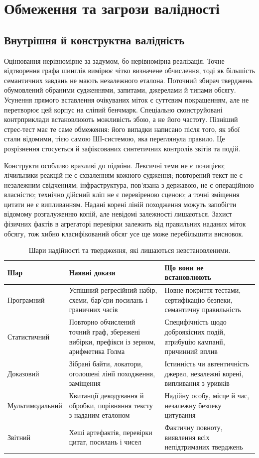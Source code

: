 \section{Обмеження та загрози валідності}
\subsection{Внутрішня й конструктна валідність}
Оцінювання нерівномірне за задумом, бо нерівномірна реалізація. Точне відтворення графа шинглів вимірює чітко визначене обчислення, тоді як більшість семантичних завдань не мають незалежного еталона. Поточний збирач тверджень обумовлений обраними судженнями, запитами, джерелами й типами обсягу. Усунення прямого вставлення очікуваних міток є суттєвим покращенням, але не перетворює цей корпус на сліпий бенчмарк. Спеціально сконструйовані контрприклади встановлюють можливість збою, а не його частоту. Пізніший стрес-тест має те саме обмеження: його випадки написано після того, як збої стали відомими, тією самою ШІ-системою, яка переглянула правило. Це розрізнення стосується й зафіксованих синтетичних контролів звітів та подій.

Конструкти особливо вразливі до підміни. Лексичні теми не є позицією; лічильники реакцій не є схваленням кожного судження; повторений текст не є незалежним свідченням; інфраструктура, пов'язана з державою, не є операційною власністю; технічно дійсний кліп не є перевіреною сценою; а точні зміщення цитати не є випливанням. Надані корені ліній походження можуть запобігти відомому розгалуженню копій, але невідомі залежності лишаються. Захист фізичних фактів в агрегаторі перевірки залежить від правильних наданих міток обсягу, тож хибно класифікований обсяг усе ще може перебільшити висновок.

\begin{table}[!htbp]
\caption{Шари надійності та твердження, які лишаються невстановленими.}
\label{tab:reliability}\small
\begin{tabularx}{\linewidth}{@{}p{27mm}X X@{}}\toprule
Шар & Наявні докази & Що вони не встановлюють\\\midrule
Програмний & Успішний регресійний набір, схеми, бар'єри посилань і граничних часів & Повне покриття тестами, сертифікацію безпеки, семантичну правильність\\
Статистичний & Повторно обчислений точний граф, збережені вибірки, префікси із зерном, арифметика Голма & Специфічність щодо доброякісних подій, атрибуцію кампанії, причинний вплив\\
Доказовий & Зібрані байти, локатори, оголошені лінії походження, заміщення & Істинність чи автентичність джерел, незалежні корені, випливання з уривків\\
Мультимодальний & Квитанції декодування й обробки, порівняння тексту з наданим еталоном & Надійну особу, місце й час, незалежну безпеку цитування\\
Звітний & Хеші артефактів, перевірки цитат, посилань і чисел & Фактичну повноту, виявлення всіх непідтриманих тверджень\\\bottomrule
\end{tabularx}
\end{table}

